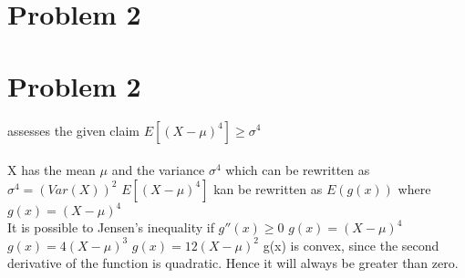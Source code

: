 \section{Problem 2}
\section{Problem 2}
assesses the given claim $E[(X-\mu)^{4}] \geq \sigma^{4}$
\\
\\
X has the mean $\mu$ and the variance $\sigma^{4}$ which can be rewritten as $\sigma^{4} = (Var(X))^2$
$E[(X-\mu)^{4}]$ kan be rewritten as $E(g(x))$ where $g(x) = (X-\mu)^{4}$
\\
It is possible to Jensen's inequality if $g''(x) \geq 0$
$g(x) = (X-\mu)^{4}$
$g(x) = 4(X-\mu)^{3}$
$g(x) = 12(X-\mu)^{2}$
g(x) is convex, since the second derivative of the function is quadratic. Hence it will always be
greater than zero.
 